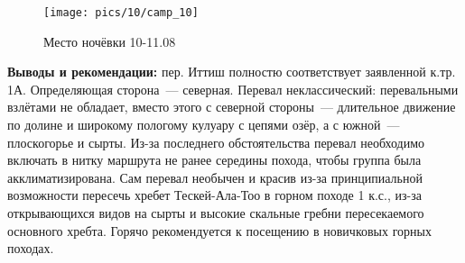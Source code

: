 \begin{figure}[h!]
	\centering
		\texttt{[image: pics/10/camp\_10]}
	\caption{Место ночёвки 10-11.08}
	\label{fig:camp_10}
\end{figure}

\textbf{Выводы и рекомендации:} пер. Иттиш полностю соответствует заявленной к.тр. 1А. Определяющая сторона~--- северная. Перевал неклассический: перевальными взлётами не обладает, вместо этого с северной стороны~--- длительное движение по долине и широкому пологому кулуару с цепями озёр, а с южной~--- плоскогорье и сырты. Из-за последнего обстоятельства перевал необходимо включать в нитку маршрута не ранее середины похода, чтобы группа была акклиматизирована. Сам перевал необычен и красив из-за принципиальной возможности пересечь хребет Тескей-Ала-Тоо в горном походе 1 к.с., из-за открывающихся видов на сырты и высокие скальные гребни пересекаемого основного хребта. Горячо рекомендуется к посещению в новичковых горных походах.

\clearpage